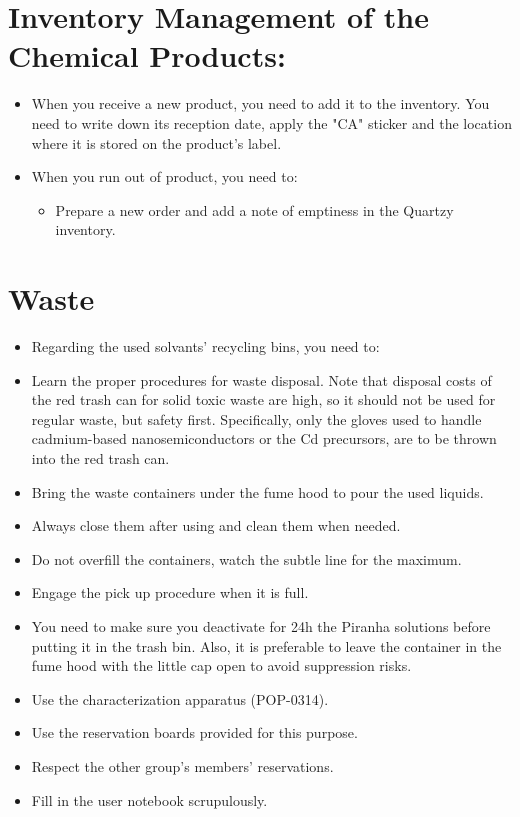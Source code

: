 \documentclass{article}
\begin{document}
\section*{Inventory Management of the Chemical Products:}
\begin{itemize}
    \item When you receive a new product, you need to add it to the inventory.  You need to write down its reception date, apply the "CA" sticker and the location where it is stored on the product’s label.
    \item When you run out of product, you need to:
    \begin{itemize}
        \item Prepare a new order and add a note of emptiness in the Quartzy inventory.
    \end{itemize}
\end{itemize}

\section*{Waste}
\begin{itemize}
    \item Regarding the used solvants’ recycling bins, you need to:
    \item Learn the proper procedures for waste disposal. Note that disposal costs of the red trash can for solid toxic waste are high, so it should not be used for regular waste, but safety first. Specifically, only the gloves used to handle cadmium-based nanosemiconductors or the Cd precursors, are to be thrown into the red trash can.
    \item Bring the waste containers under the fume hood to pour the used liquids.
    \item Always close them after using and clean them when needed.
    \item Do not overfill the containers, watch the subtle line for the maximum.
    \item Engage the pick up procedure when it is full.
    \item You need to make sure you deactivate for 24h the Piranha solutions before putting it in the trash bin.  Also, it is preferable to leave the container in the fume hood with the little cap open to avoid suppression risks.
    \item Use the characterization apparatus (POP-0314).
    \item Use the reservation boards provided for this purpose.
    \item Respect the other group’s members’ reservations.
    \item Fill in the user notebook scrupulously.
\end{itemize}
\end{document}
